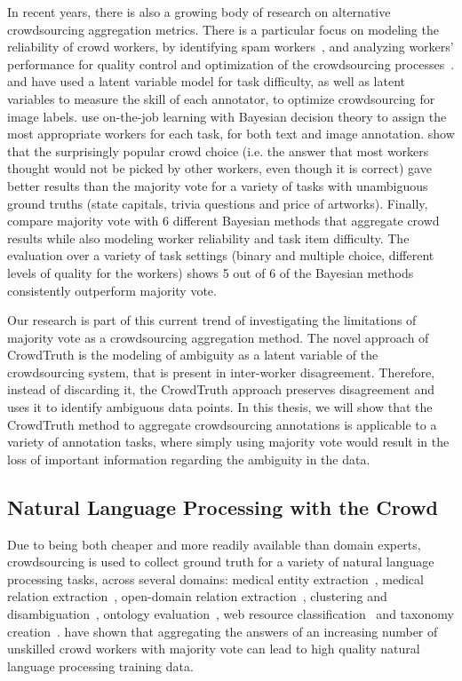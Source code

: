 In recent years, there is also a growing body of research on alternative crowdsourcing aggregation metrics. There is a particular focus on modeling the reliability of crowd workers, by identifying spam workers~\cite{Bozzon:2013,Kittur2008,Ipeirotis:2010}, and analyzing workers' performance for quality control and optimization of the crowdsourcing processes~\cite{Singer:2013}. \citet{NIPS2009_3644} and \citet{welinder2010multidimensional} have used a latent variable model for task difficulty, as well as latent variables to measure the skill of each annotator, to optimize crowdsourcing for image labels. \citet{werling2015job} use on-the-job learning with Bayesian decision theory to assign the most appropriate workers for each task, for both text and image annotation. \citet{prelec2017solution} show that the surprisingly popular crowd choice (i.e. the answer that most workers thought would not be picked by other workers, even though it is correct) gave better results than the majority vote for a variety of tasks with unambiguous ground truths (state capitals, trivia questions and price of artworks). Finally, \citet{paun2018comparing} compare majority vote with 6 different Bayesian methods that aggregate crowd results while also modeling worker reliability and task item difficulty. The evaluation over a variety of task settings (binary and multiple choice, different levels of quality for the workers) shows 5 out of 6 of the Bayesian methods consistently outperform majority vote.

Our research is part of this current trend of investigating the limitations of majority vote as a crowdsourcing aggregation method. The novel approach of CrowdTruth is the modeling of ambiguity as a latent variable of the crowdsourcing system, that is present in inter-worker disagreement. Therefore, instead of discarding it, the CrowdTruth approach preserves disagreement and uses it to identify ambiguous data points. In this thesis, we will show that the CrowdTruth method to aggregate crowdsourcing annotations is applicable to a variety of annotation tasks, where simply using majority vote would result in the loss of important information regarding the ambiguity in the data.


\subsection{Natural Language Processing with the Crowd}

Due to being both cheaper and more readily available than domain experts, crowdsourcing is used to collect ground truth for a variety of natural language processing tasks, across several domains: medical entity extraction~\cite{zhai2013web,Finin2010,van2012eu}, medical relation extraction~\cite{kilicoglu2011constructing,van2012eu}, open-domain relation extraction~\cite{kondreddi2014combining}, clustering and disambiguation~\cite{Lee2013}, ontology evaluation~\cite{noy2013mechanical}, web resource classification~\cite{castano2016human} and taxonomy creation~\cite{bragg2013crowdsourcing}. \citet{Snow2008} have shown that aggregating the answers of an increasing number of unskilled crowd workers with majority vote can lead to high quality natural language processing training data.

